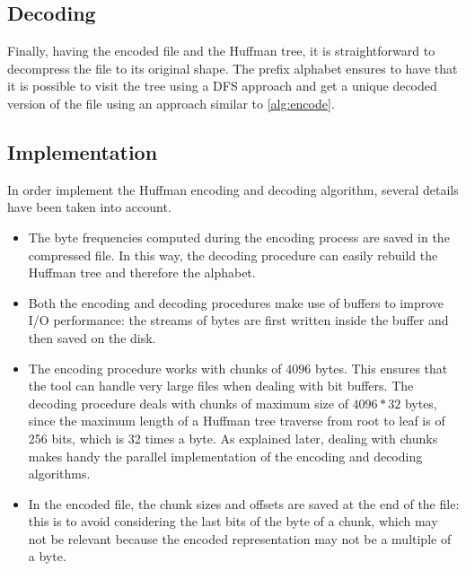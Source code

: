\subsection{Decoding}
Finally, having the encoded file and the Huffman tree, it is straightforward to decompress the file to its original shape. The prefix alphabet ensures to have that it is possible to visit the tree using a DFS approach and get a unique decoded version of the file using an approach similar to \cref{alg:encode}.

\subsection{Implementation}
In order implement the Huffman encoding and decoding algorithm, several details have been taken into account.
\begin{itemize}
    \item The byte frequencies computed during the encoding process are saved in the compressed file. In this way, the decoding procedure can easily rebuild the Huffman tree and therefore the alphabet.
    \item Both the encoding and decoding procedures make use of buffers to improve I/O performance: the streams of bytes are first written inside the buffer and then saved on the disk.
    \item The encoding procedure works with chunks of \(4096\) bytes. This ensures that the tool can handle very large files when dealing with bit buffers. The decoding procedure deals with chunks of maximum size of \(4096*32\) bytes, since the maximum length of a Huffman tree traverse from root to leaf is of 256 bits, which is 32 times a byte. As explained later, dealing with chunks makes handy the parallel implementation of the encoding and decoding algorithms.
    \item In the encoded file, the chunk sizes and offsets are saved at the end of the file: this is to avoid considering the last bits of the byte of a chunk, which may not be relevant because the encoded representation may not be a multiple of a byte.
\end{itemize}
